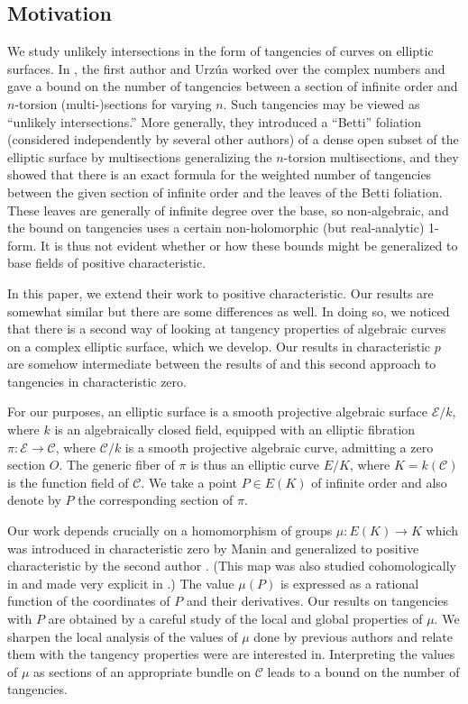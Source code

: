 \documentclass[12pt,reqno]{amsart}
\numberwithin{equation}{section}
\theoremstyle{plain}
\theoremstyle{definition}
\theoremstyle{remark}
\newcommand{\CC}{\mathcal{C}}
\newcommand{\EE}{\mathcal{E}}
\newcommand{\<}{\langle}
\renewcommand{\>}{\rangle}
\numberwithin{equation}{section}
\begin{document}
\subsection{Motivation}
We study unlikely intersections in the form of tangencies of curves on
elliptic surfaces.  In \cite{UlmerUrzua21}, the first author and
Urz\'ua worked over the complex numbers and gave a bound on the number
of tangencies between a section of infinite order and $n$-torsion
(multi-)sections for varying $n$.  Such tangencies may be viewed as
``unlikely intersections.''  More generally, they introduced a
``Betti'' foliation (considered independently by several other
authors) of a dense open subset of the elliptic surface by
multisections generalizing the $n$-torsion multisections, and they
showed that there is an exact formula for the weighted number of
tangencies between the given section of infinite order and the leaves
of the Betti foliation.  These leaves are generally of infinite degree
over the base, so non-algebraic, and the bound on tangencies uses a
certain non-holomorphic (but real-analytic) 1-form.  It is thus not
evident whether or how these bounds might be generalized to base
fields of positive characteristic.

In this paper, we extend their work to positive characteristic. Our
results are somewhat similar but there are some differences as
well. In doing so, we noticed that there is a second way of looking at
tangency properties of algebraic curves on a complex elliptic surface,
which we develop. Our results in characteristic $p$ are somehow
intermediate between the results of \cite{UlmerUrzua21} and this
second approach to tangencies in characteristic zero.

For our purposes, an elliptic surface is a smooth projective algebraic
surface $\EE/k$, where $k$ is an algebraically closed field, equipped
with an elliptic fibration $\pi: \EE\to\CC$, where $\CC/k$ is a smooth
projective algebraic curve, admitting a zero section $O$. The generic
fiber of $\pi$ is thus an elliptic curve $E/K$, where $K=k(\CC)$ is
the function field of $\CC$.  We take a point $P\in E(K)$ of infinite
order and also denote by $P$ the corresponding section of $\pi$.

Our work depends crucially on a homomorphism of groups
$\mu: E(K) \to K$ which was introduced in characteristic zero by Manin
\cite{Manin63b} and generalized to positive characteristic by the
second author \cite{Voloch90}.  (This map was also studied
cohomologically in \cite{Ulmer91} and made very explicit in
\cite{Broumas97}.)  The value $\mu(P)$ is expressed as a rational
function of the coordinates of $P$ and their derivatives. Our results
on tangencies with $P$ are obtained by a careful study of the local
and global properties of $\mu$. We sharpen the local analysis of the
values of $\mu$ done by previous authors and relate them with the
tangency properties were are interested in.  Interpreting the values
of $\mu$ as sections of an appropriate bundle on $\CC$ leads to a
bound on the number of tangencies.
\end{document}
